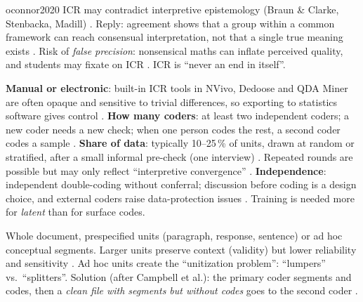\begin{papercard}{oconnor2020}
 ICR may contradict interpretive epistemology (Braun \& Clarke, Stenbacka, Madill) . Reply: agreement shows that a group within a common framework can reach consensual interpretation, not that a single true meaning exists . Risk of \emph{false precision}: nonsensical maths can inflate perceived quality, and students may fixate on ICR . ICR is ``never an end in itself''.

 \textbf{Manual or electronic}: built-in ICR tools in NVivo, Dedoose and QDA Miner are often opaque and sensitive to trivial differences, so exporting to statistics software gives control . \textbf{How many coders}: at least two independent coders; a new coder needs a new check; when one person codes the rest, a second coder codes a sample . \textbf{Share of data}: typically 10--25\,\% of units, drawn at random or stratified, after a small informal pre-check (one interview) . Repeated rounds are possible but may only reflect ``interpretive convergence'' . \textbf{Independence}: independent double-coding without conferral; discussion before coding is a design choice, and external coders raise data-protection issues . Training is needed more for \emph{latent} than for surface codes.

 Whole document, prespecified units (paragraph, response, sentence) or ad hoc conceptual segments. Larger units preserve context (validity) but lower reliability and sensitivity . Ad hoc units create the ``unitization problem'': ``lumpers'' vs.\ ``splitters''. Solution (after Campbell et al.): the primary coder segments and codes, then a \emph{clean file with segments but without codes} goes to the second coder .


\end{papercard}
